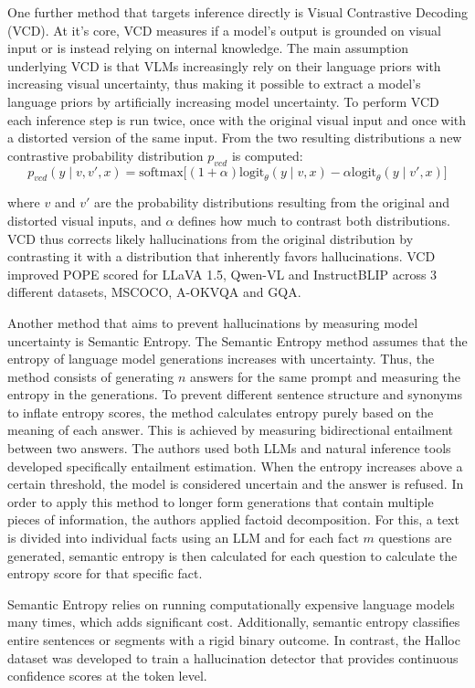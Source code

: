 One further method that targets inference directly is Visual Contrastive Decoding (VCD). At it's core, VCD measures if a model's output is grounded on visual input or is instead relying on internal knowledge. The main assumption underlying VCD is that VLMs increasingly rely on their language priors with increasing visual uncertainty, thus making it possible to extract a model's language priors by artificially increasing model uncertainty. To perform VCD each inference step is run twice, once with the original visual input and once with a distorted version of the same input. From the two resulting distributions a new contrastive probability distribution $p_{vcd}$ is computed: $$p_{vcd} (y \mid v, v', x) = \text{softmax} \big[ (1 + \alpha) \text{logit}_\theta (y \mid v, x) - \alpha \text{logit}_\theta (y \mid v', x) \big]$$

where $v$ and $v'$ are the probability distributions resulting from the original and distorted visual inputs, and $\alpha$ defines how much to contrast both distributions. VCD thus corrects likely hallucinations from the original distribution by contrasting it with a distribution that inherently favors hallucinations. VCD improved POPE scored for LLaVA 1.5, Qwen-VL and InstructBLIP across 3 different datasets, MSCOCO, A-OKVQA and GQA.

Another method that aims to prevent hallucinations by measuring model uncertainty is Semantic Entropy. The Semantic Entropy method assumes that the entropy of language model generations increases with uncertainty. Thus, the method consists of generating $n$ answers for the same prompt and measuring the entropy in the generations. To prevent different sentence structure and synonyms to inflate entropy scores, the method calculates entropy purely based on the meaning of each answer. This is achieved by measuring bidirectional entailment between two answers. The authors used both LLMs and natural inference tools developed specifically entailment estimation. When the entropy increases above a certain threshold, the model is considered uncertain and the answer is refused. In order to apply this method to longer form generations that contain multiple pieces of information, the authors applied factoid decomposition. For this, a text is divided into individual facts using an LLM and for each fact $m$ questions are generated, semantic entropy is then calculated for each question to calculate the entropy score for that specific fact.

Semantic Entropy relies on running computationally expensive language models many times, which adds significant cost. Additionally, semantic entropy classifies entire sentences or segments with a rigid binary outcome. In contrast, the Halloc dataset was developed to train a hallucination detector that provides continuous confidence scores at the token level.




